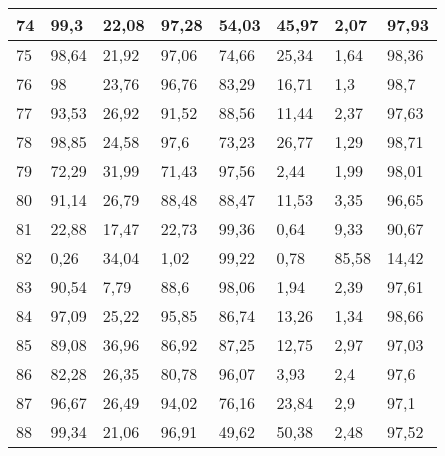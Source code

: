 \begin{longtable}[c]{|l|l|l|l|l|l|l|l|}
74              & 99,3         & 22,08        & 97,28       & 54,03         & 45,97         & 2,07          & 97,93         \\ \hline
75              & 98,64        & 21,92        & 97,06       & 74,66         & 25,34         & 1,64          & 98,36         \\ \hline
76              & 98           & 23,76        & 96,76       & 83,29         & 16,71         & 1,3           & 98,7          \\ \hline
77              & 93,53        & 26,92        & 91,52       & 88,56         & 11,44         & 2,37          & 97,63         \\ \hline
78              & 98,85        & 24,58        & 97,6        & 73,23         & 26,77         & 1,29          & 98,71         \\ \hline
79              & 72,29        & 31,99        & 71,43       & 97,56         & 2,44          & 1,99          & 98,01         \\ \hline
80              & 91,14        & 26,79        & 88,48       & 88,47         & 11,53         & 3,35          & 96,65         \\ \hline
81              & 22,88        & 17,47        & 22,73       & 99,36         & 0,64          & 9,33          & 90,67         \\ \hline
82              & 0,26         & 34,04        & 1,02        & 99,22         & 0,78          & 85,58         & 14,42         \\ \hline
83              & 90,54        & 7,79         & 88,6        & 98,06         & 1,94          & 2,39          & 97,61         \\ \hline
84              & 97,09        & 25,22        & 95,85       & 86,74         & 13,26         & 1,34          & 98,66         \\ \hline
85              & 89,08        & 36,96        & 86,92       & 87,25         & 12,75         & 2,97          & 97,03         \\ \hline
86              & 82,28        & 26,35        & 80,78       & 96,07         & 3,93          & 2,4           & 97,6          \\ \hline
87              & 96,67        & 26,49        & 94,02       & 76,16         & 23,84         & 2,9           & 97,1          \\ \hline
88              & 99,34        & 21,06        & 96,91       & 49,62         & 50,38         & 2,48          & 97,52         \\ \hline

\end{longtable}
